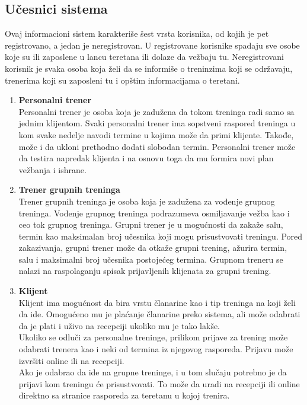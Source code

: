 \documentclass[../main.tex]{subfiles}
\begin{document}
\subsection{Učesnici sistema}
Ovaj informacioni sistem karakteriše šest vrsta korisnika, od kojih je pet registrovano, a jedan je neregistrovan. U registrovane korisnike spadaju sve osobe koje su ili zaposlene u lancu teretana ili dolaze da vežbaju tu. Neregistrovani korisnik je svaka osoba koja želi da se informiše o treninzima koji se održavaju, trenerima koji su zaposleni tu i opštim informacijama o teretani.
\begin{enumerate}
  \item \textbf{Personalni trener} \\
  Personalni trener je osoba koja je zadužena da tokom treninga radi samo sa jednim klijentom. Svaki personalni trener ima sopstveni raspored treninga u kom svake nedelje navodi termine u kojima može da primi klijente. Takođe, može i da ukloni prethodno dodati slobodan termin. Personalni trener može da testira napredak klijenta i na osnovu toga da mu formira novi plan vežbanja i ishrane.
  \item \textbf{Trener grupnih treninga} \\
  Trener grupnih treninga je osoba koja je zadužena za vođenje grupnog treninga. Vođenje grupnog treninga podrazumeva osmiljavanje vežba kao i ceo tok grupnog treninga. Grupni trener je u mogućnosti da zakaže salu, termin kao maksimalan broj učesnika koji mogu prisustvovati treningu. Pored zakazivanja, grupni trener može da otkaže grupni trening, ažurira termin, salu i maksimalni broj učesnika postojećeg termina. 
  Grupnom treneru se nalazi na raspolaganju spisak prijavljenih klijenata za grupni trening.
  \item \textbf{Klijent} \\
  Klijent ima mogućnost da bira vrstu članarine kao i tip treninga na koji želi da ide. Omogućeno mu je plaćanje članarine preko sistema, ali može odabrati da je plati i uživo na recepciji ukoliko mu je tako lakše.\\ 
  Ukoliko se odluči za personalne treninge, prilikom prijave za trening može odabrati trenera kao i neki od termina iz njegovog rasporeda. Prijavu može izvršiti online ili na recepciji.\\
  Ako je odabrao da ide na grupne treninge, i u tom slučaju potrebno je da prijavi kom treningu će prisustvovati. To može da uradi na recepciji ili online direktno sa stranice rasporeda za teretanu u kojoj trenira. 
  

\end{enumerate}
\end{document}
